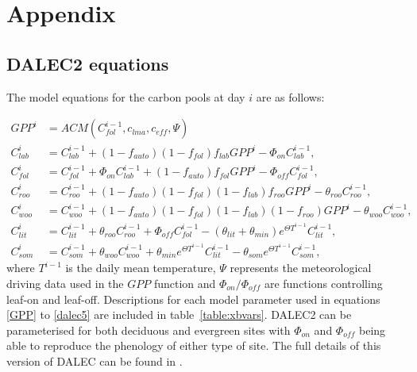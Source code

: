 \documentclass[draft,linenumbers]{agujournal}
\begin{document}

%
%
%
%
\appendix
\section{Appendix} \label{sec:appendix}

\subsection{DALEC2 equations} \label{sec:dalec_eqns}

The model equations for the carbon pools at day $i$ are as follows:

\begin{align}
GPP^{i} &= ACM(C_{fol}^{i-1}, c_{lma}, c_{eff}, \Psi) \label{GPP}
\\C_{lab}^{i}&=C_{lab}^{i-1}+(1-f_{auto})(1-f_{fol})f_{lab}GPP^{i}-\Phi _{on}C_{lab}^{i-1}, \label{daleclab}
\\C_{fol}^{i}&=C_{fol}^{i-1}+\Phi_{on}C_{lab}^{i-1}+(1-f_{auto})f_{fol}GPP^{i}-\Phi_{off}C_{fol}^{i-1}, \label{dalec1}
\\C_{roo}^{i}&=C_{roo}^{i-1}+(1-f_{auto})(1-f_{fol})(1-f_{lab})f_{roo}GPP^{i}-\theta_{roo}C_{roo}^{i-1}, 
\\C_{woo}^{i}&=C_{woo}^{i-1}+(1-f_{auto})(1-f_{fol})(1-f_{lab})(1-f_{roo})GPP^{i}-\theta_{woo}C_{woo}^{i-1}, 
\\C_{lit}^{i}&=C_{lit}^{i-1}+\theta_{roo}C_{roo}^{i-1}+\Phi_{off}C_{fol}^{i-1}-(\theta_{lit}+\theta_{min})e^{\Theta T^{i-1}}C_{lit}^{i-1}, 
\\C_{som}^{i}&=C_{som}^{i-1}+\theta_{woo}C_{woo}^{i-1}+\theta_{min}e^{\Theta T^{i-1}}C_{lit}^{i-1}-\theta_{som}e^{\Theta T^{i-1}}C_{som}^{i-1}, \label{dalec5}
\end{align}
where $T^{i-1}$ is the daily mean temperature, $\Psi$ represents the meteorological driving data used in the $GPP$ function and $\Phi_{on} / \Phi_{off}$ are functions controlling leaf-on and leaf-off. Descriptions for each model parameter used in equations \eqref{GPP} to \eqref{dalec5} are included in table~\ref{table:xbvars}. DALEC2 can be parameterised for both deciduous and evergreen sites with $\Phi_{on}$ and $\Phi_{off}$ being able to reproduce the phenology of either type of site. The full details of this version of DALEC can be found in \cite{Bloom2015}. 
\end{document}
